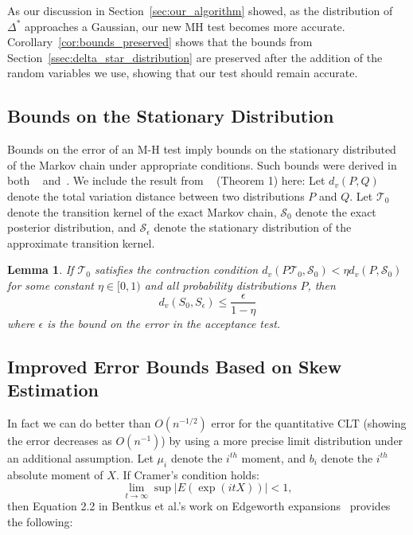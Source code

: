 \documentclass{article}
\newtheorem{lemma}{Lemma}
\begin{document}
As our discussion in Section~\ref{sec:our_algorithm} showed, as the distribution
of $\Delta^*$ approaches a Gaussian, our new MH test becomes more accurate.
Corollary~\ref{cor:bounds_preserved} shows that the bounds from
Section~\ref{ssec:delta_star_distribution} are preserved after the addition of
the random variables we use, showing that our test should remain accurate.


\subsection{Bounds on the Stationary Distribution}
Bounds on the error of an M-H test imply bounds on the stationary
distributed of the Markov chain under appropriate conditions. Such
bounds were derived in both ~\cite{cutting_mh_2014}
and~\cite{icml2014c1_bardenet14}. We include the result from
~\cite{cutting_mh_2014} (Theorem 1) here: Let $d_v(P,Q)$ denote the total
variation distance between two distributions $P$ and $Q$.  Let
$\mathcal{T}_0$ denote the transition kernel of the exact Markov
chain, $\mathcal{S}_0$ denote the exact posterior distribution,
and  $\mathcal{S}_{\epsilon}$ denote the stationary distribution
of the approximate transition kernel. 
\begin{lemma}
 If $\mathcal{T}_0$ satisfies the contraction
  condition $d_v(P\mathcal{T}_0,\mathcal{S}_0) < \eta
  d_v(P,\mathcal{S}_0)$ for some constant $\eta\in [0,1)$ and all
    probability distributions $P$, then
    \begin{equation}
      d_v(S_0, S_{\epsilon}) \leq\frac{\epsilon}{1-\eta}
    \end{equation}
where $\epsilon$ is the bound on the error in the acceptance test. 
\end{lemma}

\subsection{Improved Error Bounds Based on Skew Estimation}
In fact we can do better than $O(n^{-1/2})$ error for the quantitative CLT (showing the error decreases as
$O(n^{-1})$) by using a more precise limit distribution under an additional
assumption. Let $\mu_i$ denote the $i^{th}$ moment, and $b_i$ denote the
$i^{th}$ absolute moment of $X$. If Cramer's condition holds:
\begin{equation}\label{eq:cramers_condition}
    \lim_{t \to \infty} \sup |E(\exp(i t X))| < 1,
\end{equation}
then Equation 2.2 in Bentkus et al.'s work on Edgeworth
expansions~\cite{Bentkus97} provides the following:
\end{document}

